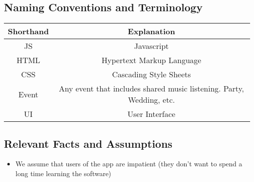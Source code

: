\documentclass[12pt, titlepage]{article}
\begin{document}
\subsection{Naming Conventions and Terminology}

\begin{table}[!h]
\centering
\begin{tabular}{ c | c }
\textbf{Shorthand} & \textbf{Explanation}\\ \hline
JS & Javascript\\
HTML & Hypertext Markup Language\\
CSS & Cascading Style Sheets\\
Event & Any event that includes shared music listening. Party, Wedding, etc. \\
UI & User Interface\\
\end{tabular}
\end{table}
\subsection{Relevant Facts and Assumptions}

\begin{itemize}
\item We assume that users of the app are impatient (they don't want to spend a
long time learning the software)
\end{itemize}
\end{document}
